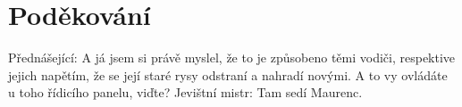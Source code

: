 \documentclass[11pt]{article}
\begin{document}
\section*{Poděkování}
Přednášející: A já jsem si právě myslel, že to je způsobeno těmi vodiči, respektive jejich napětím, že se její staré rysy odstraní a nahradí novými. A to vy ovládáte u toho řídicího panelu, viďte? Jevištní mistr: Tam sedí Maurenc.
% 
% 
\end{document}
